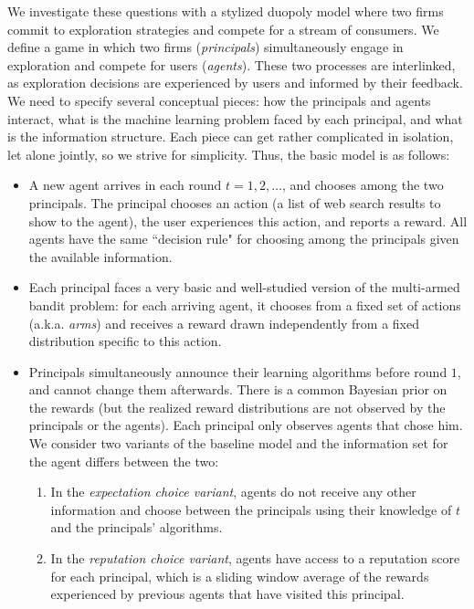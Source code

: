  We investigate these questions with a stylized duopoly model where two firms commit to exploration strategies and compete for a stream of consumers. We define a game in which two firms (\emph{principals}) simultaneously engage in exploration and compete for users (\emph{agents}). These two processes are interlinked, as exploration decisions are experienced by users and informed by their feedback. We need to specify several conceptual pieces: how the principals and agents interact, what is the machine learning problem faced by each principal, and what is the information structure. Each piece can get rather complicated in isolation, let alone jointly, so we strive for simplicity. Thus, the basic model is as follows:

\begin{itemize}

\item A new agent arrives in each round $t=1,2, \ldots$, and chooses among the two principals. The principal chooses an action (\eg a list of web search results to show to the agent), the user experiences this action, and reports a reward. All agents have the same ``decision rule" for choosing among the principals given the available information.

\item Each principal faces a very basic and well-studied version of the multi-armed bandit problem: for each arriving agent, it chooses from a fixed set of actions  (a.k.a. \emph{arms}) and receives a reward drawn independently from a fixed distribution specific to this action.

\item Principals simultaneously announce their learning algorithms before round $1$, and cannot change them afterwards. There is a common Bayesian prior on the rewards (but the realized reward distributions are not observed by the principals or the agents).  Each principal only observes agents that chose him. We consider two variants of the baseline model and the information set for the agent differs between the two:
\begin{enumerate}
\item In the \textit{expectation choice variant}, agents do not receive any other information and choose between the principals using their knowledge of $t$ and the principals' algorithms.
\item In the \textit{reputation choice variant}, agents have access to a reputation score for each principal, which is a sliding window average of the rewards experienced by previous agents that have visited this principal.
\end{enumerate}
\end{itemize}

